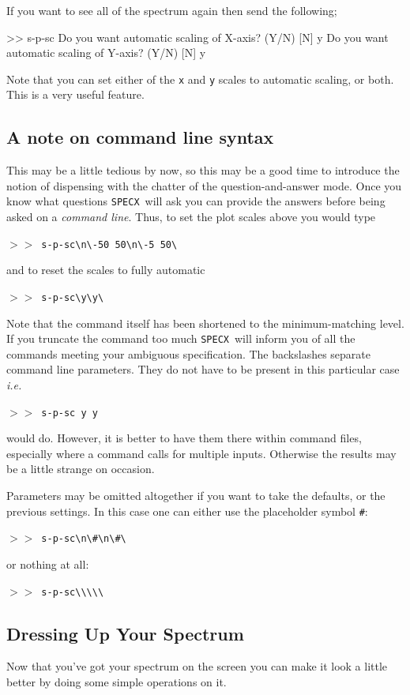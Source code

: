 \documentclass[11pt,twoside]{starlink}
\providecommand{\ie}{\textit{i.e.}}
\providecommand{\SPECX}{\texttt{SPECX}}
\providecommand{\SP}{{$>\!>$}}
\begin{document}
If you want to see all of the spectrum again then send the following;

\begin{terminalv}
>> s-p-sc
Do you want automatic scaling of X-axis? (Y/N) [N] y
Do you want automatic scaling of Y-axis? (Y/N) [N] y
\end{terminalv}

Note that you can set either of the \texttt{x} and \texttt{y} scales to
automatic scaling, or both. This is a very useful feature.

\subsection{A note on command line syntax}
\label{sec:command-line}
This may be a little tedious by now, so this may be a good time to
introduce the notion of dispensing with the chatter of the
question-and-answer mode.  Once you know what questions \SPECX\ will
ask you can provide the answers before being asked on a \textit{command
line}.  Thus, to set the plot scales above you would type

\SP\ \verb|s-p-sc\n\-50 50\n\-5 50\ |

and to reset the scales to fully automatic

\SP\ \verb|s-p-sc\y\y\ |

Note that the command itself has been shortened to the
minimum-matching level.  If you truncate the command too much \SPECX\
will inform you of all the commands meeting your ambiguous
specification. The backslashes separate command line parameters. They
do not have to be present in this particular case \ie\

\SP\ \verb|s-p-sc y y |

would do. However, it is better to have them there within command
files, especially where a command calls for multiple inputs. Otherwise
the results may be a little strange on occasion.

Parameters may be omitted altogether if you want to take the defaults,
or the previous settings. In this case one can either use the
placeholder symbol
\verb+#+:

\SP\ \verb|s-p-sc\n\#\n\#\ |

or nothing at all:

\SP\ \verb|s-p-sc\\\\\ |

\subsection{Dressing Up Your Spectrum}
\label{sec:specx_5.2}
Now that you've got your spectrum on the screen you can make it look a
little better by doing some simple operations on it.
\end{document}
